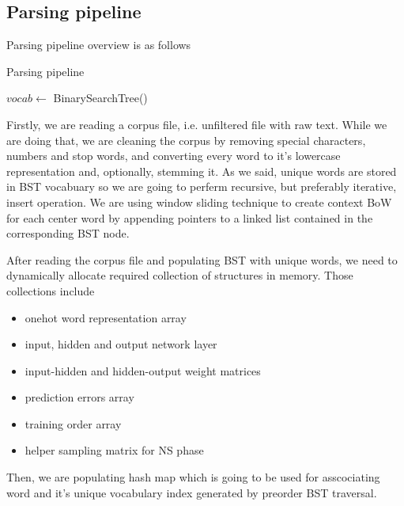 \documentclass{article}
\newcommand{\SetAlgoStyle}{
	\SetAlgoNoLine
	\SetAlgoNoEnd
	\DontPrintSemicolon
}
\begin{document}
\subsection{Parsing pipeline}

Parsing pipeline overview is as follows

\begin{algorithm}[H]
	\caption{Parsing pipeline}
	\SetAlgoStyle
	$vocab \gets$ BinarySearchTree()\;
\end{algorithm}

Firstly, we are reading a corpus file, i.e. unfiltered file with raw
text. While we are doing that, we are cleaning the corpus by removing special
characters, numbers and stop words, and converting every word to it's
lowercase representation and, optionally, stemming it. As we said, unique words are stored in BST
vocabuary so we are going to perferm recursive, but preferably iterative,
insert operation. We are using window sliding technique to create context BoW 
for each center word by appending pointers to a linked list contained in the
corresponding BST node.

\medbreak

After reading the corpus file and populating BST with unique words, we need to
dynamically allocate required collection of structures in memory. Those
collections include

\begin{itemize}
	\item onehot word representation array
	\item input, hidden and output network layer
	\item input-hidden and hidden-output weight matrices
	\item prediction errors array
	\item training order array
	\item helper sampling matrix for NS phase
\end{itemize}

\medbreak

Then, we are populating hash map which is going to be used for asscociating
word and it's unique vocabulary index generated by preorder BST traversal.
\end{document}
